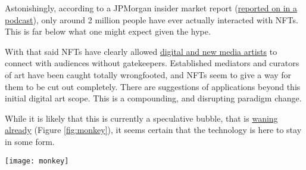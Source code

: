 Astonishingly, according to a JPMorgan insider market report (\href{https://www.coindesk.com/podcasts/the-breakdown-with-nlw/jpmorgan-bitcoin-shows-some-merit-as-a-store-of-value/}{reported on in a podcast}), only around 2 million people have ever actually interacted with NFTs. This is far below what one might expect given the hype.\par
With that said NFTs have clearly allowed \href{https://en.wikipedia.org/wiki/List_of_most_expensive_non-fungible_tokens}{digital and new media artists} to connect with audiences without gatekeepers. Established mediators and curators of art have been caught totally wrongfooted, and NFTs seem to give a way for them to be cut out completely. There are suggestions of applications beyond this initial digital art scope. This is a compounding, and disrupting paradigm change.\par
While it is likely that this is currently a speculative bubble, that is \href{https://www.bbc.co.uk/news/business-61102759}{waning already} (Figure \ref{fig:monkey}), it seems certain that the technology is here to stay in some form.\par


\begin{figure*}[ht]\centering %
	\texttt{[image: monkey]}
	\caption{The \href{https://www.coingecko.com/en/nft/bored-ape-yacht-club}{bubble bursts} on Yuga Bored Apes for now.}
	\label{fig:monkey}
\end{figure*}

